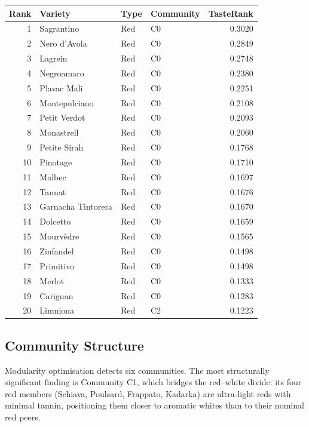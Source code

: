 \documentclass[11pt]{article}
\begin{document}
\begin{center}
\begin{tabular}{@{}rlllr@{}}
\toprule
Rank & Variety & Type & Community & TasteRank \\
\midrule
1  & Sagrantino         & Red & C0 & 0.3020 \\
2  & Nero d'Avola       & Red & C0 & 0.2849 \\
3  & Lagrein            & Red & C0 & 0.2748 \\
4  & Negroamaro         & Red & C0 & 0.2380 \\
5  & Plavac Mali        & Red & C0 & 0.2251 \\
6  & Montepulciano      & Red & C0 & 0.2108 \\
7  & Petit Verdot       & Red & C0 & 0.2093 \\
8  & Monastrell         & Red & C0 & 0.2060 \\
9  & Petite Sirah       & Red & C0 & 0.1768 \\
10 & Pinotage           & Red & C0 & 0.1710 \\
11 & Malbec             & Red & C0 & 0.1697 \\
12 & Tannat             & Red & C0 & 0.1676 \\
13 & Garnacha Tintorera & Red & C0 & 0.1670 \\
14 & Dolcetto           & Red & C0 & 0.1659 \\
15 & Mourv\`edre        & Red & C0 & 0.1565 \\
16 & Zinfandel          & Red & C0 & 0.1498 \\
17 & Primitivo          & Red & C0 & 0.1498 \\
18 & Merlot             & Red & C0 & 0.1333 \\
19 & Carignan           & Red & C0 & 0.1283 \\
20 & Limniona           & Red & C2 & 0.1223 \\
\bottomrule
\end{tabular}
\end{center}

\subsection{Community Structure}
Modularity optimisation detects six communities. The most structurally significant finding is Community C1, which bridges the red--white divide: its four red members (Schiava, Poulsard, Frappato, Kadarka) are ultra-light reds with minimal tannin, positioning them closer to aromatic whites than to their nominal red peers.
\end{document}
